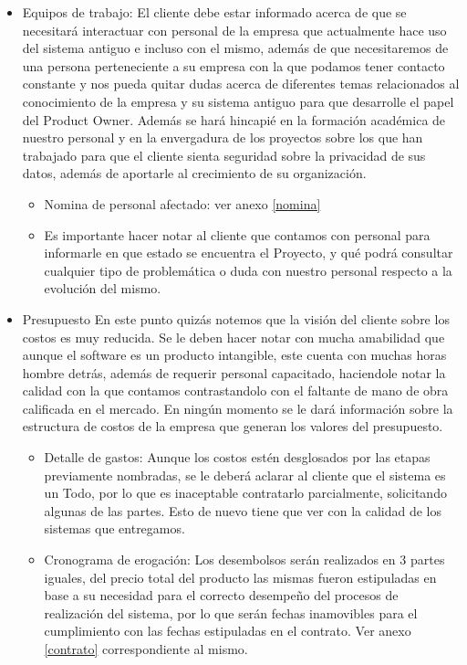 \begin{itemize}
	\item Equipos de trabajo: El cliente debe estar informado acerca de que se necesitará interactuar con personal de la empresa que actualmente hace uso del sistema antiguo e incluso con el mismo, además de que necesitaremos de una persona perteneciente a su empresa con la que podamos tener contacto constante y nos pueda quitar dudas acerca de diferentes temas relacionados al conocimiento de la empresa y su sistema antiguo para que desarrolle el papel del Product Owner.
Además se hará hincapié en la formación académica de nuestro personal y en la envergadura de los proyectos sobre los que han trabajado para que el cliente sienta seguridad sobre la privacidad de sus datos, además de aportarle al crecimiento de su organización.

	\begin{itemize}
		\item Nomina de personal afectado: ver anexo \ref{nomina}
		\item Es importante hacer notar al cliente que contamos con personal para informarle en que estado se encuentra el Proyecto, y qué podrá consultar cualquier tipo de problemática o duda con nuestro personal respecto a la evolución del mismo.

	\end{itemize} 
 
	\item Presupuesto
    En este punto quizás notemos que la visión del cliente sobre los costos es muy reducida.
Se le deben hacer notar con mucha amabilidad que aunque el software es un producto intangible, este cuenta con muchas horas hombre detrás, además de requerir personal capacitado, haciendole notar la calidad con la que contamos contrastandolo con el faltante de mano de obra calificada en el mercado. 
En ningún momento se le dará información sobre la estructura de costos de la empresa que generan los valores del presupuesto.

	\begin{itemize}
		\item Detalle de gastos:
        Aunque los costos estén desglosados por las etapas previamente nombradas, se le deberá aclarar al cliente que el sistema es un Todo, por lo que es inaceptable contratarlo parcialmente, solicitando algunas de las partes.
Esto de nuevo tiene que ver con la calidad de los sistemas que entregamos.

		\item Cronograma de erogación:
        Los desembolsos serán realizados en 3 partes iguales, del precio total del producto las mismas fueron estipuladas en base a su necesidad para el correcto desempeño del procesos de realización del sistema, por lo que serán fechas inamovibles para el cumplimiento con las fechas estipuladas en el contrato.
Ver anexo \ref{contrato} correspondiente al mismo.
	\end{itemize}
    

\end{itemize}
